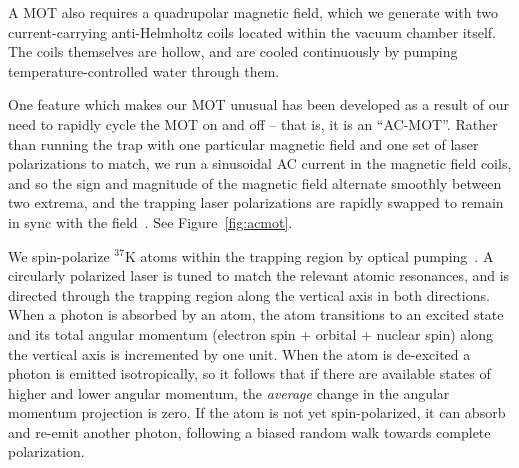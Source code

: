 A MOT also requires a quadrupolar magnetic field, which we generate with two current-carrying anti-Helmholtz coils located within the vacuum chamber itself.  The coils themselves are hollow, and are cooled continuously by pumping temperature-controlled water through them.   

One feature which makes our MOT unusual has been developed as a result of our need to rapidly cycle the MOT on and off -- that is, it is an ``AC-MOT''.  Rather than running the trap with one particular magnetic field and one set of laser polarizations to match, we run a sinusoidal AC current in the magnetic field coils, and so the sign and magnitude of the magnetic field alternate smoothly between two extrema, and the trapping laser polarizations are rapidly swapped to remain in sync with the field~\cite{harveymurray}\cite{thesis}.  See Figure~\ref{fig:acmot}.  



We spin-polarize $^{37}\textrm{K}$ atoms within the trapping region by optical pumping~\cite{ben_OP}.  A circularly polarized laser is tuned to match the relevant atomic resonances, and is directed through the trapping region along the vertical axis in both directions.  When a photon is absorbed by an atom, the atom transitions to an excited state and its total angular momentum (electron spin + orbital + nuclear spin) along the vertical axis is incremented by one unit.  When the atom is de-excited a photon is emitted isotropically, 
so it follows that if there are available states of higher and lower angular momentum, the \emph{average} change in the angular momentum projection is zero.  If the atom is not yet spin-polarized, it can absorb and re-emit another photon, following a biased random walk towards complete polarization.  


